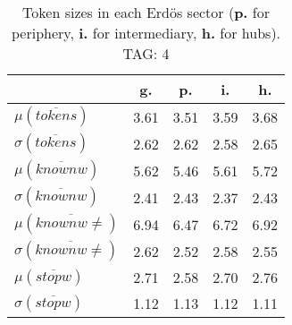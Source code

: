 \begin{table}[h!]
\begin{center}
\begin{tabular}{| l || c | c | c | c |}\hline
 & {\bf g.} & {\bf p.} & {\bf i.} & {\bf h.} \\\hline\hline
$\mu(\overline{tokens})$ & 3.61  & 3.51  & 3.59  & 3.68 \\
$\sigma(\overline{tokens})$ & 2.62  & 2.62  & 2.58  & 2.65 \\\hline
$\mu(\overline{knownw})$ & 5.62  & 5.46  & 5.61  & 5.72 \\
$\sigma(\overline{knownw})$ & 2.41  & 2.43  & 2.37  & 2.43 \\\hline
$\mu(\overline{knownw \neq})$ & 6.94  & 6.47  & 6.72  & 6.92 \\
$\sigma(\overline{knownw \neq})$ & 2.62  & 2.52  & 2.58  & 2.55 \\\hline
$\mu(\overline{stopw})$ & 2.71  & 2.58  & 2.70  & 2.76 \\
$\sigma(\overline{stopw})$ & 1.12  & 1.13  & 1.12  & 1.11 \\\hline
\end{tabular}
\caption{Token sizes in each Erd\"os sector ({{\bf p.}} for periphery, {{\bf i.}} for intermediary, {{\bf h.}} for hubs). TAG: 4}
\end{center}
\end{table}